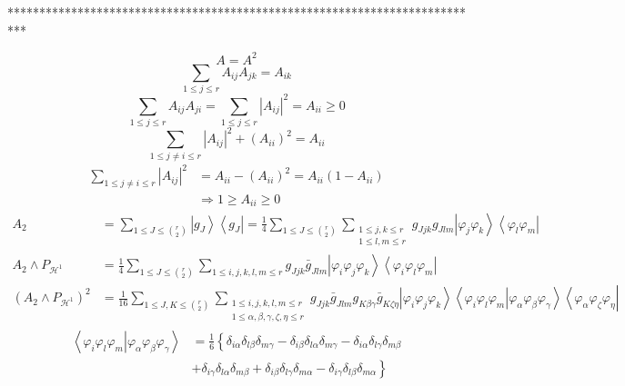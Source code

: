 \documentclass[aps,preprint]{revtex4}%
\begin{document}
\bigskip

***************************************************************************%

\begin{equation}
A=A^{2}%
\end{equation}%
\begin{equation}
\sum_{1\leq j\leq r}A_{ij}A_{jk}=A_{ik}%
\end{equation}%
\begin{equation}
\sum_{1\leq j\leq r}A_{ij}A_{ji}=\sum_{1\leq j\leq r}\left\vert A_{ij}%
\right\vert ^{2}=A_{ii}\geq0
\end{equation}%
\begin{equation}
\sum_{1\leq j\neq i\leq r}\left\vert A_{ij}\right\vert ^{2}+\left(
A_{ii}\right)  ^{2}=A_{ii}%
\end{equation}%
\begin{align}
\sum_{1\leq j\neq i\leq r}\left\vert A_{ij}\right\vert ^{2} &  =A_{ii}-\left(
A_{ii}\right)  ^{2}=A_{ii}\left(  1-A_{ii}\right)  \\
&  \Rightarrow1\geq A_{ii}\geq0
\end{align}%
\begin{align}
A_{2} &  =\sum_{1\leq J\leq\binom{r}{2}}\left\vert g_{J}\right\rangle
\left\langle g_{J}\right\vert =\frac{1}{4}\sum_{1\leq J\leq\binom{r}{2}}%
\sum_{\substack{1\leq j,k\leq r\\1\leq l,m\leq r}}g_{Jjk}g_{Jlm}\left\vert
\varphi_{j}\varphi_{k}\right\rangle \left\langle \varphi_{l}\varphi
_{m}\right\vert \\
A_{2}\wedge P_{\mathcal{H}^{1}} &  =\frac{1}{4}\sum_{1\leq J\leq\binom{r}{2}%
}\sum_{1\leq i,j,k,l,m\leq r}g_{Jjk}\bar{g}_{Jlm}\left\vert \varphi_{i}%
\varphi_{j}\varphi_{k}\right\rangle \left\langle \varphi_{i}\varphi_{l}%
\varphi_{m}\right\vert \\
\left(  A_{2}\wedge P_{\mathcal{H}^{1}}\right)  ^{2} &  =\frac{1}{16}%
\sum_{1\leq J,K\leq\binom{r}{2}}\sum_{\substack{1\leq i,j,k,l,m\leq
r\\1\leq\alpha,\beta,\gamma,\zeta,\eta\leq r}}g_{Jjk}\bar{g}_{Jlm}%
g_{K\beta\gamma}\bar{g}_{K\zeta\eta}\left\vert \varphi_{i}\varphi_{j}%
\varphi_{k}\right\rangle \left\langle \varphi_{i}\varphi_{l}\varphi
_{m}\left\vert \varphi_{\alpha}\varphi_{\beta}\varphi_{\gamma}\right.
\right\rangle \left\langle \varphi_{\alpha}\varphi_{\zeta}\varphi_{\eta
}\right\vert
\end{align}%
\begin{align}
\left\langle \varphi_{i}\varphi_{l}\varphi_{m}\left\vert \varphi_{\alpha
}\varphi_{\beta}\varphi_{\gamma}\right.  \right\rangle  &  =\frac{1}%
{6}\left\{  \delta_{i\alpha}\delta_{l\beta}\delta_{m\gamma}-\delta_{i\beta
}\delta_{l\alpha}\delta_{m\gamma}-\delta_{i\alpha}\delta_{l\gamma}%
\delta_{m\beta}\right.  \nonumber\\
&  +\left.  \delta_{i\gamma}\delta_{l\alpha}\delta_{m\beta}+\delta_{i\beta
}\delta_{l\gamma}\delta_{m\alpha}-\delta_{i\gamma}\delta_{l\beta}%
\delta_{m\alpha}\right\}
\end{align}
\end{document}
